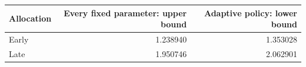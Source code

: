 \begin{tabular}{lrr}
\hline
Allocation & Every fixed parameter: upper bound & Adaptive policy: lower bound \\
\hline
Early & 1.238940 & 1.353028 \\
Late & 1.950746 & 2.062901 \\
\hline
\end{tabular}
